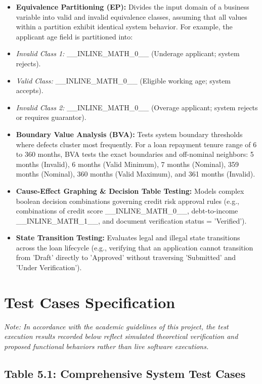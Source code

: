 \begin{itemize}
  \item \textbf{Equivalence Partitioning (EP):} Divides the input domain of a business variable into valid and invalid equivalence classes, assuming that all values within a partition exhibit identical system behavior. For example, the applicant age field is partitioned into:
  \item \textit{Invalid Class 1:} \_\_INLINE\_MATH\_0\_\_ (Underage applicant; system rejects).
  \item \textit{Valid Class:} \_\_INLINE\_MATH\_0\_\_ (Eligible working age; system accepts).
  \item \textit{Invalid Class 2:} \_\_INLINE\_MATH\_0\_\_ (Overage applicant; system rejects or requires guarantor).
  \item \textbf{Boundary Value Analysis (BVA):} Tests system boundary thresholds where defects cluster most frequently. For a loan repayment tenure range of 6 to 360 months, BVA tests the exact boundaries and off-nominal neighbors: 5 months (Invalid), 6 months (Valid Minimum), 7 months (Nominal), 359 months (Nominal), 360 months (Valid Maximum), and 361 months (Invalid).
  \item \textbf{Cause-Effect Graphing \& Decision Table Testing:} Models complex boolean decision combinations governing credit risk approval rules (e.g., combinations of credit score \_\_INLINE\_MATH\_0\_\_, debt-to-income \_\_INLINE\_MATH\_1\_\_, and document verification status = 'Verified').
  \item \textbf{State Transition Testing:} Evaluates legal and illegal state transitions across the loan lifecycle (e.g., verifying that an application cannot transition from 'Draft' directly to 'Approved' without traversing 'Submitted' and 'Under Verification').
\end{itemize}

\section{Test Cases Specification}

\textit{Note: In accordance with the academic guidelines of this project, the test execution results recorded below reflect simulated theoretical verification and proposed functional behaviors rather than live software executions.}

\subsection{Table 5.1: Comprehensive System Test Cases}

